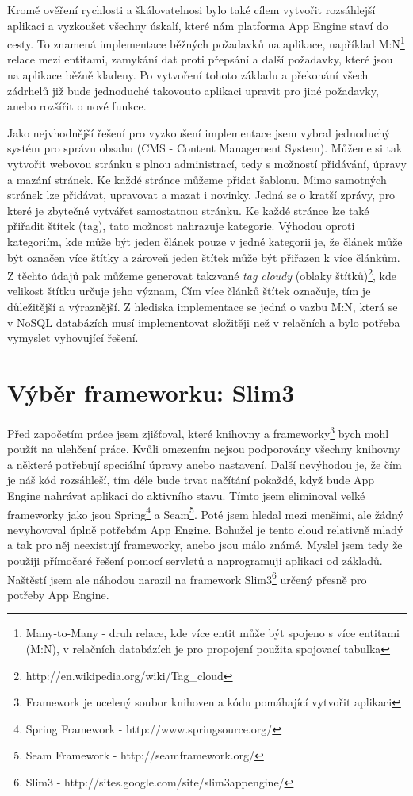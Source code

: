 Kromě ověření rychlosti a škálovatelnosi bylo také cílem vytvořit rozsáhlejší aplikaci a vyzkoušet všechny úskalí, které nám platforma App Engine staví do cesty. To znamená implementace běžných požadavků na aplikace, například M:N\footnote{Many-to-Many - druh relace, kde více entit může být spojeno s více entitami (M:N), v relačních databázích je pro propojení použita spojovací tabulka} relace mezi entitami, zamykání dat proti přepsání a další požadavky, které jsou na aplikace běžně kladeny. Po vytvoření tohoto základu a překonání všech zádrhelů již bude jednoduché takovouto aplikaci upravit pro jiné požadavky, anebo rozšířit o nové funkce.

Jako nejvhodnější řešení pro vyzkoušení implementace jsem vybral jednoduchý systém pro správu obsahu (CMS - Content Management System). Můžeme si tak vytvořit webovou  stránku s plnou administrací, tedy s možností přidávání, úpravy a mazání stránek. Ke každé stránce můžeme přidat šablonu. Mimo samotných stránek lze přidávat, upravovat a mazat i novinky. Jedná se o kratší zprávy, pro které je zbytečné vytvářet samostatnou stránku. Ke každé stránce lze také přiřadit štítek (tag), tato možnost nahrazuje kategorie. Výhodou oproti kategoriím, kde může být jeden článek pouze v jedné kategorii je, že článek může být označen více štítky a zároveň jeden štítek může být přiřazen k více článkům. Z těchto údajů pak můžeme generovat takzvané \emph{tag cloudy} (oblaky štítků)\footnote{http://en.wikipedia.org/wiki/Tag\_cloud}, kde velikost štítku určuje jeho význam, Čím více článků štítek označuje, tím je důležitější a výraznější. Z hlediska implementace se jedná o vazbu M:N, která se v NoSQL databázích musí implementovat složitěji než v relačních a bylo potřeba vymyslet vyhovující řešení.

\section{Výběr frameworku: Slim3}
Před započetím práce jsem zjišťoval, které knihovny a frameworky\footnote{Framework je ucelený soubor knihoven a kódu pomáhající vytvořit aplikaci} bych mohl použít na ulehčení práce. Kvůli omezením nejsou podporovány všechny knihovny a některé potřebují speciální úpravy anebo nastavení. Další nevýhodou je, že čím je náš kód rozsáhleší, tím déle bude trvat načítání pokaždé, když bude App Engine nahrávat aplikaci do aktivního stavu. Tímto jsem eliminoval velké frameworky jako jsou Spring\footnote{Spring Framework - http://www.springsource.org/} a Seam\footnote{Seam Framework - http://seamframework.org/}. Poté jsem hledal mezi menšími, ale žádný nevyhovoval úplně potřebám App Engine. Bohužel je tento cloud relativně mladý a tak pro něj neexistují frameworky, anebo jsou málo známé. Myslel jsem tedy že použiji přímočaré řešení pomocí servletů a naprogramuji aplikaci od základů. Naštěstí jsem ale náhodou narazil na framework Slim3\footnote{Slim3 - http://sites.google.com/site/slim3appengine/} určený přesně pro potřeby App Engine.

